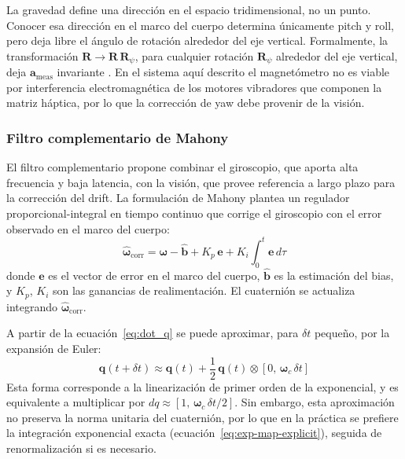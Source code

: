 La gravedad define una dirección en el espacio tridimensional, no un punto.
Conocer esa dirección en el marco del cuerpo determina únicamente pitch y
roll, pero deja libre el ángulo de rotación alrededor del eje vertical.
Formalmente, la transformación $\mathbf{R} \to \mathbf{R}\,\mathbf{R}_{\psi}$,
para cualquier rotación $\mathbf{R}_{\psi}$ alrededor del eje vertical, deja
$\mathbf{a}_{\text{meas}}$ invariante \cite{Hartley2004}. En el sistema aquí
descrito el magnetómetro no es viable por interferencia electromagnética de los
motores vibradores que componen la matriz háptica, por lo que la corrección de
yaw debe provenir de la visión.

\subsubsection{Filtro complementario de Mahony}

El filtro complementario propone combinar el giroscopio, que aporta alta
frecuencia y baja latencia, con la visión, que provee referencia a largo plazo
para la corrección del drift. La formulación de Mahony \cite{Madgwick2010}
plantea un regulador proporcional-integral en tiempo continuo que corrige el
giroscopio con el error observado en el marco del cuerpo:
%
\begin{equation}
  \label{eq:mahony-correction}
  \hat{\boldsymbol{\omega}}_{\text{corr}} =
  \boldsymbol{\omega} - \hat{\mathbf{b}} + K_p\,\mathbf{e} + K_i\!\int_0^t \mathbf{e}\,d\tau
\end{equation}
%
donde $\mathbf{e}$ es el vector de error en el marco del cuerpo,
$\hat{\mathbf{b}}$ es la estimación del bias, y $K_p$, $K_i$ son las ganancias
de realimentación. El cuaternión se actualiza integrando $\hat{\boldsymbol{\omega}}_{\text{corr}}$.

A partir de la ecuación~\ref{eq:dot_q} se puede aproximar, para $\delta t$ pequeño, por la expansión de Euler:
%
\begin{equation}
\label{eq:euler-linearization}
\mathbf{q}(t+\delta t) \approx \mathbf{q}(t) + \frac{1}{2}\,\mathbf{q}(t) \otimes [0,\,\boldsymbol{\omega}_c\,\delta t]
\end{equation}
%
Esta forma corresponde a la linearización de primer orden de la exponencial, y es equivalente a multiplicar por $dq \approx [1,\,\boldsymbol{\omega}_c\,\delta t/2]$. Sin embargo, esta aproximación no preserva la norma unitaria del cuaternión, por lo que en la práctica se prefiere la integración exponencial exacta (ecuación~\ref{eq:exp-map-explicit}), seguida de renormalización si es necesario.




